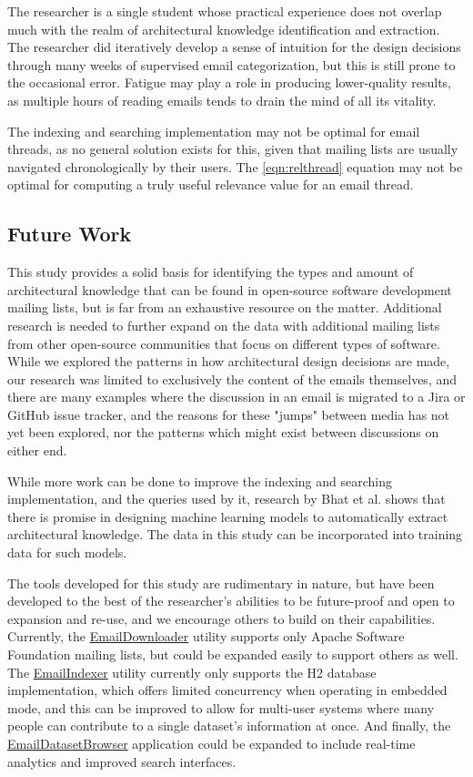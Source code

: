 \documentclass[a4paper, 12pt]{article}
\begin{document}
		The researcher is a single student whose practical experience does not overlap much with the realm of architectural knowledge identification and extraction. The researcher did iteratively develop a sense of intuition for the design decisions through many weeks of supervised email categorization, but this is still prone to the occasional error. Fatigue may play a role in producing lower-quality results, as multiple hours of reading emails tends to drain the mind of all its vitality.
		
		The indexing and searching implementation may not be optimal for email threads, as no general solution exists for this, given that mailing lists are usually navigated chronologically by their users. The \ref{eqn:relthread} equation may not be optimal for computing a truly useful relevance value for an email thread.
		
	\subsection{Future Work}
		This study provides a solid basis for identifying the types and amount of architectural knowledge that can be found in open-source software development mailing lists, but is far from an exhaustive resource on the matter. Additional research is needed to further expand on the data with additional mailing lists from other open-source communities that focus on different types of software. While we explored the patterns in how architectural design decisions are made, our research was limited to exclusively the content of the emails themselves, and there are many examples where the discussion in an email is migrated to a Jira or GitHub issue tracker, and the reasons for these "jumps" between media has not yet been explored, nor the patterns which might exist between discussions on either end.
		
		While more work can be done to improve the indexing and searching implementation, and the queries used by it, research by Bhat et al.\cite{bhat} shows that there is promise in designing machine learning models to automatically extract architectural knowledge. The data in this study can be incorporated into training data for such models.
		
		The tools developed for this study are rudimentary in nature, but have been developed to the best of the researcher's abilities to be future-proof and open to expansion and re-use, and we encourage others to build on their capabilities. Currently, the \href{https://github.com/ArchitecturalKnowledgeAnalysis/EmailDownloader}{EmailDownloader} utility supports only Apache Software Foundation mailing lists, but could be expanded easily to support others as well. The \href{https://github.com/ArchitecturalKnowledgeAnalysis/EmailIndexer}{EmailIndexer} utility currently only supports the H2 database implementation, which offers limited concurrency when operating in embedded mode, and this can be improved to allow for multi-user systems where many people can contribute to a single dataset's information at once. And finally, the \href{https://github.com/ArchitecturalKnowledgeAnalysis/EmailDatasetBrowser}{EmailDatasetBrowser} application could be expanded to include real-time analytics and improved search interfaces.
\end{document}
